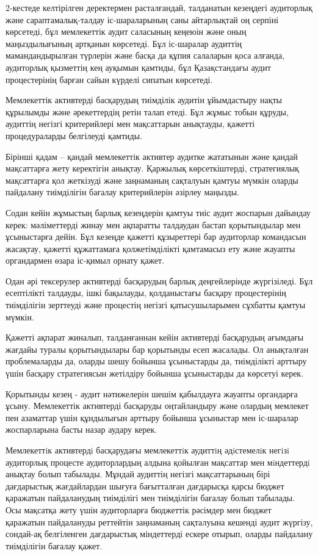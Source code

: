\begin{multicols}{2}
2-кестеде келтірілген деректермен расталғандай, талданатын кезеңдегі
аудиторлық және сараптамалық-талдау іс-шараларының саны айтарлықтай оң
серпіні көрсетеді, бұл мемлекеттік аудит саласының кеңеюін және оның
маңыздылығының артқанын көрсетеді. Бұл іс-шаралар аудиттің
мамандандырылған түрлерін және басқа да құпия салаларын қоса алғанда,
аудиторлық қызметтің кең ауқымын қамтиды, бұл Қазақстандағы аудит
процестерінің барған сайын күрделі сипатын көрсетеді.

Мемлекеттік активтерді басқарудың тиімділік аудитін ұйымдастыру нақты
құрылымды және әрекеттердің ретін талап етеді. Бұл жұмыс тобын құруды,
аудиттің негізгі критерийлері мен мақсаттарын анықтауды, қажетті
процедураларды белгілеуді қамтиды.

Бірінші қадам -- қандай мемлекеттік активтер аудитке жататынын және
қандай мақсаттарға жету керектігін анықтау. Қаржылық көрсеткіштерді,
стратегиялық мақсаттарға қол жеткізуді және заңнаманың сақталуын қамтуы
мүмкін оларды пайдалану тиімділігін бағалау критерийлерін әзірлеу
маңызды.

Содан кейін жұмыстың барлық кезеңдерін қамтуы тиіс аудит жоспарын
дайындау керек: мәліметтерді жинау мен ақпаратты талдаудан бастап
қорытындылар мен ұсыныстарға дейін. Бұл кезеңде қажетті құзыреттері бар
аудиторлар командасын жасақтау, қажетті құжаттамаға қолжетімділікті
қамтамасыз ету және жауапты органдармен өзара іс-қимыл орнату қажет.

Одан әрі тексерулер активтерді басқарудың барлық деңгейлерінде
жүргізіледі. Бұл есептілікті талдауды, ішкі бақылауды, қолданыстағы
басқару процестерінің тиімділігін зерттеуді және процестің негізгі
қатысушыларымен сұхбатты қамтуы мүмкін.

Қажетті ақпарат жиналып, талданғаннан кейін активтерді басқарудың
ағымдағы жағдайы туралы қорытындылары бар қорытынды есеп жасалады. Ол
анықталған проблемаларды да, оларды шешу бойынша ұсыныстарды да,
тиімділікті арттыру үшін басқару стратегиясын жетілдіру бойынша
ұсыныстарды да көрсетуі керек.

Қорытынды кезең - аудит нәтижелерін шешім қабылдауға жауапты органдарға
ұсыну. Мемлекеттік активтерді басқаруды оңтайландыру және олардың
мемлекет пен азаматтар үшін құндылығын арттыру бойынша ұсыныстар мен
іс-шаралар жоспарларына басты назар аудару керек.

Мемлекеттiк активтердi басқарудағы мемлекеттiк аудиттiң әдiстемелiк
негiзi аудиторлық процесте аудиторлардың алдына қойылған мақсаттар мен
мiндеттердi анықтау болып табылады. Мұндай аудиттің негізгі
мақсаттарының бірі дағдарыстық жағдайлардан шығуға бағытталған
дағдарысқа қарсы бюджет қаражатын пайдаланудың тиімділігі мен
тиімділігін бағалау болып табылады. Осы мақсатқа жету үшін аудиторларға
бюджеттік рәсімдер мен бюджет қаражатын пайдалануды реттейтін заңнаманың
сақталуына кешенді аудит жүргізу, сондай-ақ белгіленген дағдарыстық
міндеттерді ескере отырып, оларды пайдалану тиімділігін бағалау қажет.


\end{multicols}
